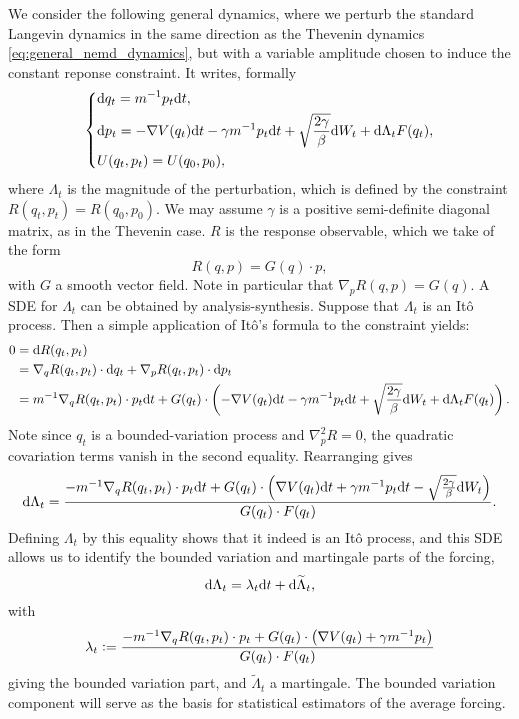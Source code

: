 We consider the following general dynamics, where we perturb the standard Langevin dynamics in the same direction as the Thevenin dynamics \eqref{eq:general_nemd_dynamics}, but with a variable amplitude chosen to induce the constant reponse constraint.
It writes, formally
\begin{equation}
    \label{eq:norton__dynamics_general}
    \left\{ 
        \begin{aligned}
            &\mathrm{d} q_t=m^{-1}p_t\mathrm{d} t,\\
            &\mathrm{d} p_t=-\nabla V(q_t)\mathrm{d} t-\gamma m^{-1}p_t\mathrm{d} t +\sqrt{\frac{2\gamma}\beta}\mathrm{d} W_t +\mathrm{d} \Lambda_t F(q_t),\\
            &U(q_t,p_t)=U(q_0,p_0),
        \end{aligned}
    \right.
\end{equation}
where $\Lambda_t$ is the magnitude of the perturbation, which is defined by the constraint $R(q_t,p_t)=R(q_0,p_0)$.
We may assume $\gamma$ is a positive semi-definite diagonal matrix, as in the Thevenin case. $R$ is the response observable, which we take of the form
\[R(q,p)=G(q)\cdot p,\]
with $G$ a smooth vector field. Note in particular that $\nabla_p R(q,p)=G(q)$.
A SDE for $\Lambda_t$ can be obtained by analysis-synthesis. Suppose that $\Lambda_t$ is an Itô process. Then a simple application of Itô's formula to the constraint yields:
\begin{align*}
    0&=\mathrm{d} R(q_t,p_t)\\
    &=\nabla_q R(q_t,p_t)\cdot \mathrm{d} q_t+\nabla_p R(q_t,p_t)\cdot \mathrm{d} p_t\\
    &=m^{-1}\nabla_q R(q_t,p_t) \cdot p_t \mathrm{d} t + G(q_t)\cdot \left(-\nabla V(q_t)\mathrm{d} t-\gamma m^{-1}p_t\mathrm{d} t +\sqrt{\frac{2\gamma}\beta}\mathrm{d} W_t +\mathrm{d} \Lambda_t F(q_t)\right).
\end{align*}
Note since $q_t$ is a bounded-variation process and $\nabla^2_p R=0$, the quadratic covariation terms vanish in the second equality. Rearranging gives 
\begin{equation}
    \label{eq:norton_sv_forcing_sde}
    \mathrm{d}\Lambda_t = \frac{-m^{-1}\nabla_q R(q_t,p_t)\cdot p_t \mathrm{d} t+G(q_t)\cdot\left(\nabla V(q_t)\mathrm{d} t+\gamma m^{-1}p_t\mathrm{d} t-\sqrt{\frac{2\gamma}\beta}\mathrm{d} W_t \right)}{G(q_t)\cdot F(q_t)}.
\end{equation}
Defining $\Lambda_t$ by this equality shows that it indeed is an Itô process, and this SDE allows us to identify the bounded variation and martingale parts of the forcing, 
\begin{equation}
    \mathrm{d} \Lambda_t=\lambda_t\mathrm{d} t+\mathrm{d} \widetilde{\Lambda}_t,
\end{equation}
with 
\begin{equation}
    \label{eq:norton_sv_forcing_bv_part}
    \lambda_t\mathrel{\mathop:}= \frac{-m^{-1}\nabla_q R(q_t,p_t)\cdot p_t+G(q_t)\cdot\left(\nabla V(q_t)+\gamma m^{-1}p_t\right)}{G(q_t)\cdot F(q_t)}
\end{equation}
giving the bounded variation part, and $\widetilde{\Lambda}_t$ a martingale. The bounded variation component will serve as the basis for statistical estimators of the average forcing.

